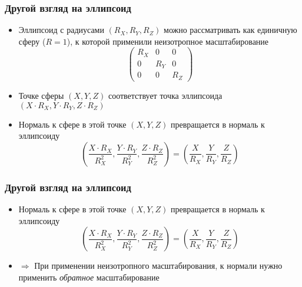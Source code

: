 \documentclass[10pt]{beamer}
\begin{document}
\begin{frame}[fragile]
\frametitle{Другой взгляд на эллипсоид}
\begin{itemize}
\item Эллипсоид с радиусами \begin{math}(R_X, R_Y, R_Z)\end{math} можно рассматривать как единичную сферу (\begin{math}R=1\end{math}), к которой применили неизотропное масштабирование
\begin{equation*}
\begin{pmatrix}
R_X & 0 & 0 \\
0 & R_Y & 0 \\
0 & 0 & R_Z
\end{pmatrix}
\end{equation*}
\pause
\item Точке сферы \begin{math}(X, Y, Z)\end{math} соответствует точка эллипсоида \begin{math}(X\cdot R_X,Y\cdot R_Y,Z\cdot R_Z)\end{math}
\pause
\item Нормаль к сфере в этой точке \begin{math}(X, Y, Z)\end{math} превращается в нормаль к эллипсоиду
\begin{equation*}
\left(\frac{X\cdot R_X}{R_X^2},\frac{Y\cdot R_Y}{R_Y^2},\frac{Z\cdot R_Z}{R_Z^2}\right) = \left(\frac{X}{R_X},\frac{Y}{R_Y},\frac{Z}{R_Z}\right)
\end{equation*}
\end{itemize}
\end{frame}

\begin{frame}[fragile]
\frametitle{Другой взгляд на эллипсоид}
\begin{itemize}
\item Нормаль к сфере в этой точке \begin{math}(X, Y, Z)\end{math} превращается в нормаль к эллипсоиду
\begin{equation*}
\left(\frac{X\cdot R_X}{R_X^2},\frac{Y\cdot R_Y}{R_Y^2},\frac{Z\cdot R_Z}{R_Z^2}\right) = \left(\frac{X}{R_X},\frac{Y}{R_Y},\frac{Z}{R_Z}\right)
\end{equation*}
\pause
\item \begin{math}\Longrightarrow\end{math} При применении неизотропного масштабирования, к нормали нужно применить \textit{обратное} масштабирование
\end{itemize}
\end{frame}
\end{document}
